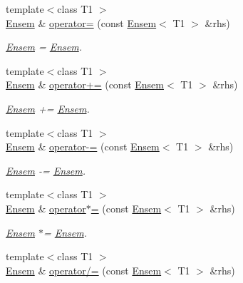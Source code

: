 \begin{DoxyCompactItemize}
{\footnotesize template$<$class T1 $>$ }\\\mbox{\hyperlink{classENSEM_1_1Ensem}{Ensem}} \& \mbox{\hyperlink{classENSEM_1_1Ensem_a83f34607867df5f1fb9ad887354de48d}{operator=}} (const \mbox{\hyperlink{classENSEM_1_1Ensem}{Ensem}}$<$ T1 $>$ \&rhs)
\begin{DoxyCompactList}\small\item\em \mbox{\hyperlink{classENSEM_1_1Ensem}{Ensem}} = \mbox{\hyperlink{classENSEM_1_1Ensem}{Ensem}}. \end{DoxyCompactList}\item 
{\footnotesize template$<$class T1 $>$ }\\\mbox{\hyperlink{classENSEM_1_1Ensem}{Ensem}} \& \mbox{\hyperlink{classENSEM_1_1Ensem_ae24bd27a7f5a8ffed6ad4361956596fd}{operator+=}} (const \mbox{\hyperlink{classENSEM_1_1Ensem}{Ensem}}$<$ T1 $>$ \&rhs)
\begin{DoxyCompactList}\small\item\em \mbox{\hyperlink{classENSEM_1_1Ensem}{Ensem}} += \mbox{\hyperlink{classENSEM_1_1Ensem}{Ensem}}. \end{DoxyCompactList}\item 
{\footnotesize template$<$class T1 $>$ }\\\mbox{\hyperlink{classENSEM_1_1Ensem}{Ensem}} \& \mbox{\hyperlink{classENSEM_1_1Ensem_ae3f3e36d96a4600e56c2b139e7897186}{operator-\/=}} (const \mbox{\hyperlink{classENSEM_1_1Ensem}{Ensem}}$<$ T1 $>$ \&rhs)
\begin{DoxyCompactList}\small\item\em \mbox{\hyperlink{classENSEM_1_1Ensem}{Ensem}} -\/= \mbox{\hyperlink{classENSEM_1_1Ensem}{Ensem}}. \end{DoxyCompactList}\item 
{\footnotesize template$<$class T1 $>$ }\\\mbox{\hyperlink{classENSEM_1_1Ensem}{Ensem}} \& \mbox{\hyperlink{classENSEM_1_1Ensem_ae6590e101b18547ec3d2682ecbea0371}{operator$\ast$=}} (const \mbox{\hyperlink{classENSEM_1_1Ensem}{Ensem}}$<$ T1 $>$ \&rhs)
\begin{DoxyCompactList}\small\item\em \mbox{\hyperlink{classENSEM_1_1Ensem}{Ensem}} $\ast$= \mbox{\hyperlink{classENSEM_1_1Ensem}{Ensem}}. \end{DoxyCompactList}\item 
{\footnotesize template$<$class T1 $>$ }\\\mbox{\hyperlink{classENSEM_1_1Ensem}{Ensem}} \& \mbox{\hyperlink{classENSEM_1_1Ensem_aa0d7f0d69f4c1c1adc551c91abcf271a}{operator/=}} (const \mbox{\hyperlink{classENSEM_1_1Ensem}{Ensem}}$<$ T1 $>$ \&rhs)

\end{DoxyCompactItemize}
